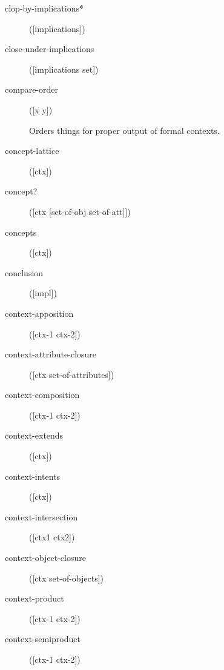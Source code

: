 \begin{description}
  \item[clop-by-implications*]
([implications])



  \item[close-under-implications]
([implications set])



  \item[compare-order]
([x y])

Orders things for proper output of formal contexts.

  \item[concept-lattice]
([ctx])



  \item[concept?]
([ctx [set-of-obj set-of-att]])



  \item[concepts]
([ctx])



  \item[conclusion]
([impl])



  \item[context-apposition]
([ctx-1 ctx-2])



  \item[context-attribute-closure]
([ctx set-of-attributes])



  \item[context-composition]
([ctx-1 ctx-2])



  \item[context-extends]
([ctx])



  \item[context-intents]
([ctx])



  \item[context-intersection]
([ctx1 ctx2])



  \item[context-object-closure]
([ctx set-of-objects])



  \item[context-product]
([ctx-1 ctx-2])



  \item[context-semiproduct]
([ctx-1 ctx-2])




\end{description}
